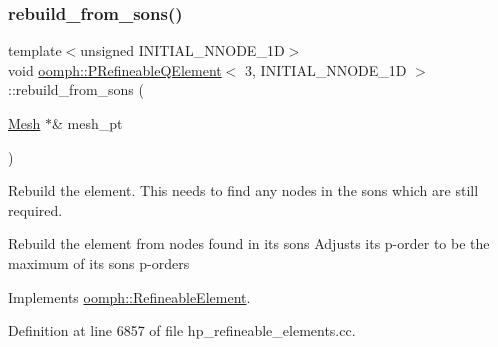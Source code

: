 \mbox{\label{classoomph_1_1PRefineableQElement_3_013_00_01INITIAL__NNODE__1D_01_4_ae4014ced0f6a6cdb14b9ae53efcd5fb8}} 
\subsubsection{\texorpdfstring{rebuild\+\_\+from\+\_\+sons()}{rebuild\_from\_sons()}}
{\footnotesize\ttfamily template$<$unsigned I\+N\+I\+T\+I\+A\+L\+\_\+\+N\+N\+O\+D\+E\+\_\+1D$>$ \\
void \hyperlink{classoomph_1_1PRefineableQElement}{oomph\+::\+P\+Refineable\+Q\+Element}$<$ 3, I\+N\+I\+T\+I\+A\+L\+\_\+\+N\+N\+O\+D\+E\+\_\+1D $>$\+::rebuild\+\_\+from\+\_\+sons (\begin{DoxyParamCaption}\item[{\hyperlink{classoomph_1_1Mesh}{Mesh} $\ast$\&}]{mesh\+\_\+pt }\end{DoxyParamCaption})\hspace{0.3cm}{\ttfamily [virtual]}}

Rebuild the element. This needs to find any nodes in the sons which are still required.

Rebuild the element from nodes found in its sons Adjusts its p-\/order to be the maximum of its sons\textquotesingle{} p-\/orders 

Implements \hyperlink{classoomph_1_1RefineableElement_a33324be27833fa4b78279d17158215fa}{oomph\+::\+Refineable\+Element}.



Definition at line 6857 of file hp\+\_\+refineable\+\_\+elements.\+cc.



